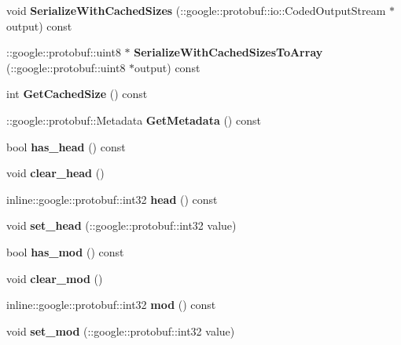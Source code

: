 \begin{DoxyCompactItemize}
\item 
\hypertarget{classDep_a1c5ffae565cd93485ba1b7de07678efc}{
void {\bfseries SerializeWithCachedSizes} (::google::protobuf::io::CodedOutputStream $\ast$output) const }
\label{classDep_a1c5ffae565cd93485ba1b7de07678efc}

\item 
\hypertarget{classDep_a302a9df44af045d0f56ef4e14ee97816}{
::google::protobuf::uint8 $\ast$ {\bfseries SerializeWithCachedSizesToArray} (::google::protobuf::uint8 $\ast$output) const }
\label{classDep_a302a9df44af045d0f56ef4e14ee97816}

\item 
\hypertarget{classDep_a0574f835da4e18501475c30e0b38ba20}{
int {\bfseries GetCachedSize} () const }
\label{classDep_a0574f835da4e18501475c30e0b38ba20}

\item 
\hypertarget{classDep_acadc4712c5930d210c03df3d288358a9}{
::google::protobuf::Metadata {\bfseries GetMetadata} () const }
\label{classDep_acadc4712c5930d210c03df3d288358a9}

\item 
\hypertarget{classDep_a7c31851d796bf8cb968b420fd07548cb}{
bool {\bfseries has\_\-head} () const }
\label{classDep_a7c31851d796bf8cb968b420fd07548cb}

\item 
\hypertarget{classDep_a32575258e5019204e6f4f53822181528}{
void {\bfseries clear\_\-head} ()}
\label{classDep_a32575258e5019204e6f4f53822181528}

\item 
\hypertarget{classDep_aedebdf8b34a2f8f2705c3846e8ea78ed}{
inline::google::protobuf::int32 {\bfseries head} () const }
\label{classDep_aedebdf8b34a2f8f2705c3846e8ea78ed}

\item 
\hypertarget{classDep_a43e73a016a5444b2e9f310eb0e2b671b}{
void {\bfseries set\_\-head} (::google::protobuf::int32 value)}
\label{classDep_a43e73a016a5444b2e9f310eb0e2b671b}

\item 
\hypertarget{classDep_a81b4aebd91b63196e503f80b3f1cb5d4}{
bool {\bfseries has\_\-mod} () const }
\label{classDep_a81b4aebd91b63196e503f80b3f1cb5d4}

\item 
\hypertarget{classDep_a286ffa524525424af7af0c509282b22c}{
void {\bfseries clear\_\-mod} ()}
\label{classDep_a286ffa524525424af7af0c509282b22c}

\item 
\hypertarget{classDep_a53412c9bbc37fb2f0bbe124f8a131c72}{
inline::google::protobuf::int32 {\bfseries mod} () const }
\label{classDep_a53412c9bbc37fb2f0bbe124f8a131c72}

\item 
\hypertarget{classDep_a3aa1f026840c0ec1631e4383399309f8}{
void {\bfseries set\_\-mod} (::google::protobuf::int32 value)}
\label{classDep_a3aa1f026840c0ec1631e4383399309f8}

\end{DoxyCompactItemize}
